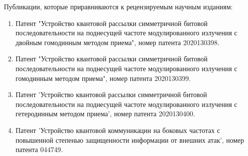 Публикации, которые приравниваются к рецензируемым научным изданиям:\\ 
\begin{enumerate}
    \item Патент "Устройство квантовой рассылки симметричной битовой последовательности на поднесущей частоте модулированного излучения с двойным гомодинным методом приема", номер патента 2020130398.
    \item Патент "Устройство квантовой рассылки симметричной битовой последовательности на поднесущей частоте модулированного излучения с гомодинным методом приема", номер патента 2020130399.
    \item Патент 'Устройство квантовой рассылки симметричной битовой последовательности на поднесущей частоте модулированного излучения с гетеродинным методом приема', номер патента 2020130400.
    \item Патент 'Устройство квантовой коммуникации на боковых частотах с повышенной степенью защищенности информации от внешних атак', номер патента 044749.

\end{enumerate}
